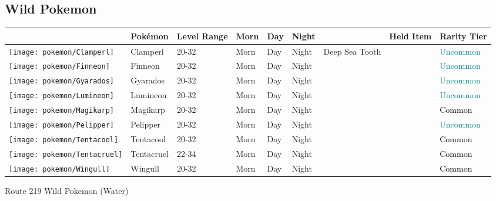 \subsection{Wild Pokemon}%
\label{subsec:WildPokemon}%
\begin{longtable}{||l l l l l l l l l||}%
\hline%
&Pokémon&Level Range&Morn&Day&Night&&Held Item&Rarity Tier\\%
\hline%
\endhead%
\hline%
\texttt{[image: pokemon/Clamperl]}&Clamperl&20{-}32&Morn&Day&Night&Deep Sea Tooth&&\textcolor{teal}{%
Uncommon%
}\\%
\hline%
\texttt{[image: pokemon/Finneon]}&Finneon&20{-}32&Morn&Day&Night&&&\textcolor{teal}{%
Uncommon%
}\\%
\hline%
\texttt{[image: pokemon/Gyarados]}&Gyarados&20{-}32&Morn&Day&Night&&&\textcolor{teal}{%
Uncommon%
}\\%
\hline%
\texttt{[image: pokemon/Lumineon]}&Lumineon&20{-}32&Morn&Day&Night&&&\textcolor{teal}{%
Uncommon%
}\\%
\hline%
\texttt{[image: pokemon/Magikarp]}&Magikarp&20{-}32&Morn&Day&Night&&&\textcolor{black}{%
Common%
}\\%
\hline%
\texttt{[image: pokemon/Pelipper]}&Pelipper&20{-}32&Morn&Day&Night&&&\textcolor{teal}{%
Uncommon%
}\\%
\hline%
\texttt{[image: pokemon/Tentacool]}&Tentacool&20{-}32&Morn&Day&Night&&&\textcolor{black}{%
Common%
}\\%
\hline%
\texttt{[image: pokemon/Tentacruel]}&Tentacruel&22{-}34&Morn&Day&Night&&&\textcolor{black}{%
Common%
}\\%
\hline%
\texttt{[image: pokemon/Wingull]}&Wingull&20{-}32&Morn&Day&Night&&&\textcolor{black}{%
Common%
}\\%
\hline%
\end{longtable}%
\caption{Route 219 Wild Pokemon (Water)}